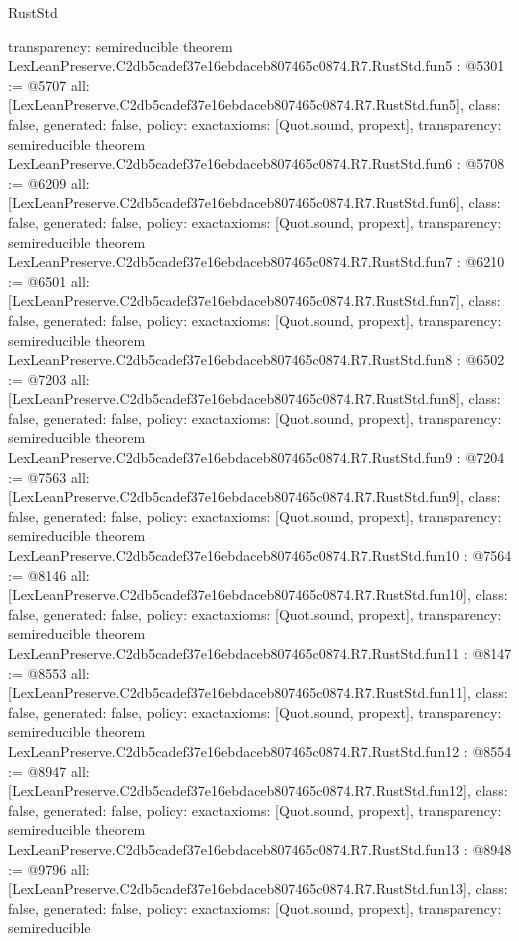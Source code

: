 \begin{lexlean}{RustStd}
\begin{coremodule}
{  transparency: semireducible
}
theorem LexLeanPreserve.C2db5cadef37e16ebdaceb807465c0874.R7.RustStd.fun5 : @5301 := @5707 {
  all: [LexLeanPreserve.C2db5cadef37e16ebdaceb807465c0874.R7.RustStd.fun5],
  class: false,
  generated: false,
  policy: exact{axioms: [Quot.sound, propext]},
  transparency: semireducible
}
theorem LexLeanPreserve.C2db5cadef37e16ebdaceb807465c0874.R7.RustStd.fun6 : @5708 := @6209 {
  all: [LexLeanPreserve.C2db5cadef37e16ebdaceb807465c0874.R7.RustStd.fun6],
  class: false,
  generated: false,
  policy: exact{axioms: [Quot.sound, propext]},
  transparency: semireducible
}
theorem LexLeanPreserve.C2db5cadef37e16ebdaceb807465c0874.R7.RustStd.fun7 : @6210 := @6501 {
  all: [LexLeanPreserve.C2db5cadef37e16ebdaceb807465c0874.R7.RustStd.fun7],
  class: false,
  generated: false,
  policy: exact{axioms: [Quot.sound, propext]},
  transparency: semireducible
}
theorem LexLeanPreserve.C2db5cadef37e16ebdaceb807465c0874.R7.RustStd.fun8 : @6502 := @7203 {
  all: [LexLeanPreserve.C2db5cadef37e16ebdaceb807465c0874.R7.RustStd.fun8],
  class: false,
  generated: false,
  policy: exact{axioms: [Quot.sound, propext]},
  transparency: semireducible
}
theorem LexLeanPreserve.C2db5cadef37e16ebdaceb807465c0874.R7.RustStd.fun9 : @7204 := @7563 {
  all: [LexLeanPreserve.C2db5cadef37e16ebdaceb807465c0874.R7.RustStd.fun9],
  class: false,
  generated: false,
  policy: exact{axioms: [Quot.sound, propext]},
  transparency: semireducible
}
theorem LexLeanPreserve.C2db5cadef37e16ebdaceb807465c0874.R7.RustStd.fun10 : @7564 := @8146 {
  all: [LexLeanPreserve.C2db5cadef37e16ebdaceb807465c0874.R7.RustStd.fun10],
  class: false,
  generated: false,
  policy: exact{axioms: [Quot.sound, propext]},
  transparency: semireducible
}
theorem LexLeanPreserve.C2db5cadef37e16ebdaceb807465c0874.R7.RustStd.fun11 : @8147 := @8553 {
  all: [LexLeanPreserve.C2db5cadef37e16ebdaceb807465c0874.R7.RustStd.fun11],
  class: false,
  generated: false,
  policy: exact{axioms: [Quot.sound, propext]},
  transparency: semireducible
}
theorem LexLeanPreserve.C2db5cadef37e16ebdaceb807465c0874.R7.RustStd.fun12 : @8554 := @8947 {
  all: [LexLeanPreserve.C2db5cadef37e16ebdaceb807465c0874.R7.RustStd.fun12],
  class: false,
  generated: false,
  policy: exact{axioms: [Quot.sound, propext]},
  transparency: semireducible
}
theorem LexLeanPreserve.C2db5cadef37e16ebdaceb807465c0874.R7.RustStd.fun13 : @8948 := @9796 {
  all: [LexLeanPreserve.C2db5cadef37e16ebdaceb807465c0874.R7.RustStd.fun13],
  class: false,
  generated: false,
  policy: exact{axioms: [Quot.sound, propext]},
  transparency: semireducible
}
\end{coremodule}
\end{lexlean}
